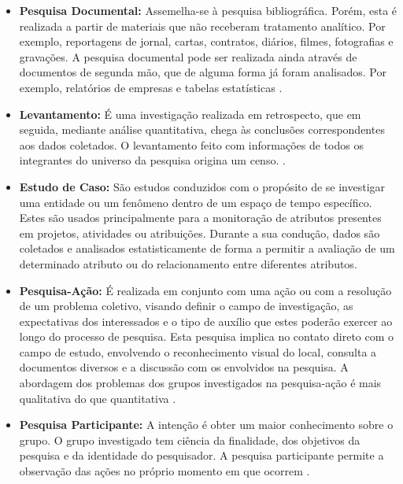 \begin{apendicesenv}
\begin{itemize}
\begin{itemize}
			\item \textbf{Pesquisa Documental:} Assemelha-se à pesquisa bibliográfica. Porém, esta é realizada a partir de materiais que não receberam tratamento analítico. Por exemplo, reportagens de jornal, cartas, contratos, diários, filmes, fotografias e gravações. A pesquisa documental pode ser realizada ainda através de documentos de segunda mão, que de alguma forma já foram analisados. Por exemplo, relatórios de empresas e tabelas estatísticas \cite{Gil:2010}.

			\item \textbf{Levantamento:} É uma investigação realizada em retrospecto, que em seguida, mediante análise quantitativa, chega às conclusões correspondentes aos dados coletados. O levantamento feito com informações de todos os integrantes do universo da pesquisa origina um censo. \cite{Mafra:Travassos:2006}.
			
			\item \textbf{Estudo de Caso:} São estudos conduzidos com o propósito de se investigar uma entidade ou um fenômeno dentro de um espaço de tempo específico. Estes são usados principalmente para a monitoração de atributos presentes em projetos, atividades ou atribuições. Durante a sua condução, dados são coletados e analisados estatisticamente de forma a permitir a avaliação de um determinado atributo ou do relacionamento entre diferentes atributos. \cite{Mafra:Travassos:2006}
			
			\item \textbf{Pesquisa-Ação:} É realizada em conjunto com uma ação ou com a resolução de um problema coletivo, visando definir o campo de investigação, as expectativas dos interessados e o tipo de auxílio que estes poderão exercer ao longo do processo de pesquisa. Esta pesquisa implica no contato direto com o campo de estudo, envolvendo o reconhecimento visual do local, consulta a documentos diversos e a discussão com os envolvidos na pesquisa. A abordagem dos problemas dos grupos investigados na pesquisa-ação é mais qualitativa do que quantitativa \cite{Silva:Tafner:2007}.
			
			\item \textbf{Pesquisa Participante:} A intenção é obter um maior conhecimento sobre o grupo. O grupo investigado tem ciência da finalidade, dos objetivos da pesquisa e da identidade do pesquisador. A pesquisa participante permite a observação das ações no próprio momento em que ocorrem \cite{Silva:Tafner:2007}.
			

\end{itemize}
\end{itemize}
\end{apendicesenv}
